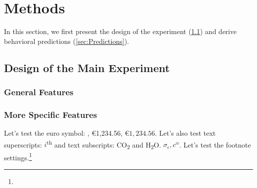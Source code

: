 



\section{Methods}
\label{sec:Methods}

In this section, we first present the design of the experiment (\ref{sec:design}) and derive behavioral predictions (\ref{sec:Predictions}).

\subsection{Design of the Main Experiment}
\label{sec:design}

\subsubsection{General Features}
\blindtext

\subsubsection{More Specific Features}
\blindtext

Let's test the euro symbol: \texteuro, \euro 1,234.56, $\euro 1{,}234.56$. Let's also test text superscripts: $i$\textsuperscript{th} and text subscripts: CO\textsubscript{2} and H\textsubscript{2}O.
$\sigma_\epsilon, c^\alpha$.
\blindtext
Let's test the footnote settings.\footnote{\blindmathfalse\blindtext\blindmathtrue} 

